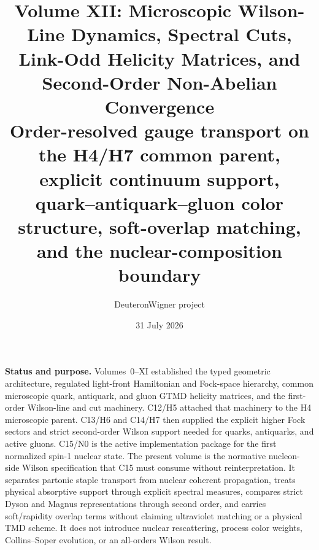 \documentclass[11pt]{article}
\title{\vspace{-1.0cm}
{\color{navy}\bfseries Volume XII: Microscopic Wilson-Line Dynamics, Spectral Cuts,\\[2mm]
Link-Odd Helicity Matrices, and Second-Order Non-Abelian Convergence}\\[4mm]
\large Order-resolved gauge transport on the H4/H7 common parent, explicit continuum support,\\
quark--antiquark--gluon color structure, soft-overlap matching, and the nuclear-composition boundary}
\author{DeuteronWigner project}
\date{31 July 2026}
\begin{document}
\maketitle

\begin{center}
\begin{minipage}{0.94\textwidth}
\colorbox{softblue}{\parbox{0.96\textwidth}{
\textbf{Status and purpose.}
Volumes~0--XI established the typed geometric architecture, regulated
light-front Hamiltonian and Fock-space hierarchy, common microscopic quark,
antiquark, and gluon GTMD helicity matrices, and the first-order Wilson-line
and cut machinery.  C12/H5 attached that machinery to the H4 microscopic
parent.  C13/H6 and C14/H7 then supplied the explicit higher Fock sectors and
strict second-order Wilson support needed for quarks, antiquarks, and active
gluons.  C15/N0 is the active implementation package for the first normalized
spin-1 nuclear state.  The present volume is the normative nucleon-side
Wilson specification that C15 must consume without reinterpretation.  It
separates partonic staple transport from nuclear coherent propagation, treats
physical absorptive support through explicit spectral measures, compares
strict Dyson and Magnus representations through second order, and carries
soft/rapidity overlap terms without claiming ultraviolet matching or a
physical TMD scheme.  It does not introduce nuclear rescattering, process
color weights, Collins--Soper evolution, or an all-orders Wilson result.
}}
\end{minipage}
\end{center}
\end{document}
